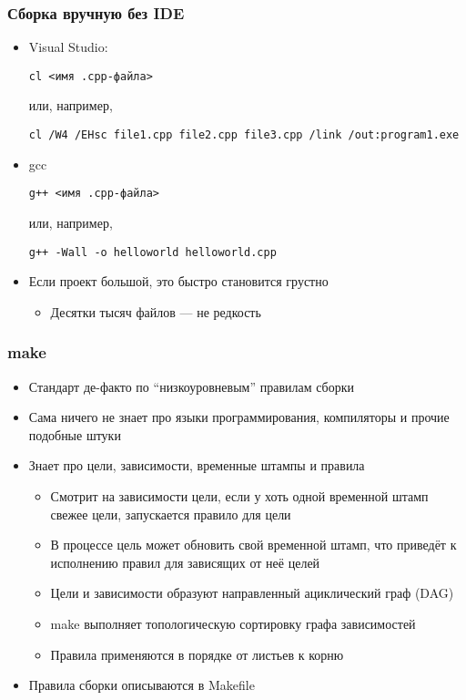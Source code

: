 \documentclass[xetex,mathserif,serif]{beamer}
\begin{document}
	\begin{frame}[fragile]
		\frametitle{Сборка вручную без IDE}
		\begin{itemize}
			\item Visual Studio:
			\begin{footnotesize}
				\begin{verbatim}
cl <имя .cpp-файла>
				\end{verbatim}
			\end{footnotesize}
			или, например,
			\begin{footnotesize}
				\begin{verbatim}
cl /W4 /EHsc file1.cpp file2.cpp file3.cpp /link /out:program1.exe
				\end{verbatim}
			\end{footnotesize}
			\item gcc
			\begin{footnotesize}
				\begin{verbatim}
g++ <имя .cpp-файла>
				\end{verbatim}
			\end{footnotesize}
			или, например,
			\begin{footnotesize}
				\begin{verbatim}
g++ -Wall -o helloworld helloworld.cpp
				\end{verbatim}
			\end{footnotesize}
			\item Если проект большой, это быстро становится грустно
			\begin{itemize}
				\item Десятки тысяч файлов --- не редкость
			\end{itemize}
		\end{itemize}
	\end{frame}

	\begin{frame}
		\frametitle{make}
		\begin{itemize}
			\item Стандарт де-факто по ``низкоуровневым'' правилам сборки
			\item Сама ничего не знает про языки программирования, компиляторы и прочие подобные штуки
			\item Знает про цели, зависимости, временные штампы и правила
			\begin{itemize}
				\item Смотрит на зависимости цели, если у хоть одной временной штамп свежее цели, запускается правило для цели
				\item В процессе цель может обновить свой временной штамп, что приведёт к исполнению правил для зависящих от неё целей
				\item Цели и зависимости образуют направленный ациклический граф (DAG)
				\item make выполняет топологическую сортировку графа зависимостей
				\item Правила применяются в порядке от листьев к корню
			\end{itemize}
			\item Правила сборки описываются в Makefile
		\end{itemize}
	\end{frame}
\end{document}
